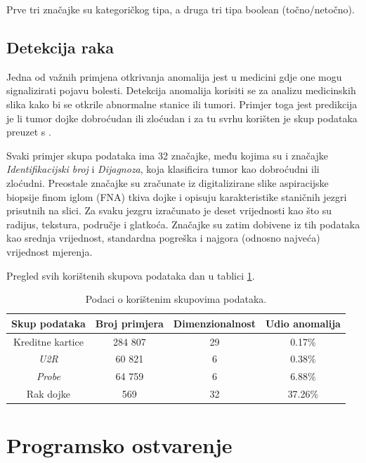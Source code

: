 \documentclass[utf8, diplomski, numeric]{fer}
\begin{document}
Prve tri značajke su kategoričkog tipa, a druga tri tipa boolean (točno/netočno).

\section{Detekcija raka}
Jedna od važnih primjena otkrivanja anomalija jest u medicini gdje one mogu signalizirati pojavu bolesti. Detekcija anomalija korisiti se za analizu medicinskih slika kako bi se otkrile abnormalne stanice ili tumori. Primjer toga jest predikcija je li tumor dojke dobroćudan ili zloćudan i za tu svrhu korišten je skup podataka preuzet s \cite{Dua:2019}.

Svaki primjer skupa podataka ima 32 značajke, među kojima su i značajke \textit{Identifikacijski broj} i \textit{Dijagnoza}, koja klasificira tumor kao dobroćudni ili zloćudni. Preostale značajke su zračunate iz digitalizirane slike aspiracijske biopsije finom iglom (FNA) tkiva dojke i opisuju karakteristike staničnih jezgri prisutnih na slici. Za svaku jezgru izračunato je deset vrijednosti kao što su radijus, tekstura, područje i glatkoća. Značajke su zatim dobivene iz tih podataka kao srednja vrijednost, standardna pogreška i najgora (odnosno najveća) vrijednost mjerenja. 

Pregled svih korištenih skupova podataka dan u tablici \ref{tab:datasets}.

\begin{table}[h!]
  \begin{center}
    \caption{Podaci o korištenim skupovima podataka.}
    \label{tab:datasets}
    \begin{tabular}{c|c|c|c} 
      \textbf{Skup podataka} & \textbf{Broj primjera} & \textbf{Dimenzionalnost}  & \textbf{Udio anomalija}\\
      \hline
      Kreditne kartice & 284 807 & 29 & 0.17\% \\
      \textit{U2R} & 60 821 & 6 & 0.38\% \\
      \textit{Probe} & 64 759 & 6 & 6.88\% \\
      Rak dojke & 569& 32 & 37.26\% \\
     \end{tabular}
  \end{center}
\end{table}

\chapter{Programsko ostvarenje}
\end{document}
